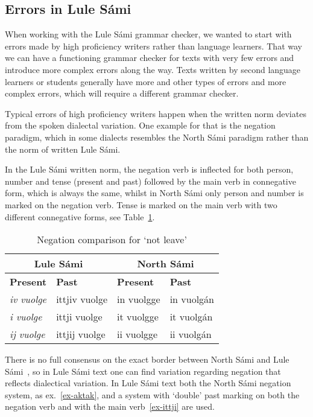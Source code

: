\documentclass[free]{flammie}
\begin{document}
\subsection{Errors in Lule Sámi }

When working with the Lule Sámi grammar checker, we wanted to start with errors
made by high proficiency writers rather than language learners. That way we can
have a functioning grammar checker for texts with very few errors and introduce
more complex errors along the way. Texts written by second language learners or
students generally have more and other types of errors and more complex errors,
which will require a different grammar checker.

Typical errors of high proficiency writers happen when the written norm deviates
from the spoken dialectal variation. One example for that is the negation
paradigm, which in some dialects resembles the North Sámi paradigm rather than
the norm of written Lule Sámi.

In the Lule Sámi written norm, the negation verb is inflected for both person,
number and tense (present and past) followed by the main verb in connegative
form, which is always the same, whilst in North Sámi only person and number is
marked on the negation verb. Tense is marked on the main verb with two different
connegative forms, see Table~\ref{Negation}.



\begin{table}[h]
    \centering
    \begin{tabular}{llll}
    \multicolumn{2}{c}{Lule Sámi} & \multicolumn{2}{c}{North Sámi}\\
         \toprule
         \textbf{Present} & \textbf{Past} &  \textbf{Present} & \textbf{Past} \\
         \midrule
         \textit{iv vuolge} & {ittjiv vuolge} &  {in vuolgge} & {in vuolgán} \\
         \textit{i vuolge} & {ittji vuolge} &  {it vuolgge} & {it vuolgán} \\
         \textit{ij vuolge} & {ittjij vuolge} &  {ii vuolgge} & {ii vuolgán} \\
         \bottomrule
         \end{tabular}
    \caption{Negation comparison for `not leave'\label{Negation}}
\end{table}

There is no full consensus on the exact border between North Sámi and Lule
Sámi~\cite{Ylikoski2016future}, so in Lule Sámi text one can find variation regarding negation
that reflects dialectical variation. In Lule Sámi text both the North Sámi
negation system, as ex.~\ref{ex-aktak}, and a system with `double' past marking
on both the negation verb and with the main verb~\ref{ex-ittji} are used.
\end{document}
